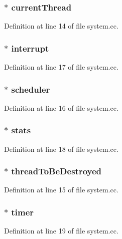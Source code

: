 \subsubsection[{current\+Thread}]{$\ast$ current\+Thread}\label{system_8h_adaaeabb00ed38fe27a24eb9d81eb2ace}


Definition at line 14 of file system.\+cc.

\subsubsection[{interrupt}]{$\ast$ interrupt}\label{system_8h_a3fd5c19f3e649bec3c8bd658cd258aca}


Definition at line 17 of file system.\+cc.

\subsubsection[{scheduler}]{$\ast$ scheduler}\label{system_8h_a0af0114c406f687347d551154125b00c}


Definition at line 16 of file system.\+cc.

\subsubsection[{stats}]{$\ast$ stats}\label{system_8h_a88dfa3573015231289dd03a4bbec3ca3}


Definition at line 18 of file system.\+cc.

\subsubsection[{thread\+To\+Be\+Destroyed}]{$\ast$ thread\+To\+Be\+Destroyed}\label{system_8h_a50e41e8be26bc4469871db0c3324b7e4}


Definition at line 15 of file system.\+cc.

\subsubsection[{timer}]{$\ast$ timer}\label{system_8h_ad59f2b60cccbf7bd6a43003017d1d01a}


Definition at line 19 of file system.\+cc.

